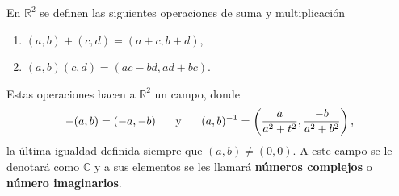 

\begin{definition}
En $\mathbb{R}^2$ se definen las siguientes operaciones de suma y multiplicación
\begin{enumerate}[label=\textnormal{(\roman*)}]
\item $(a,b) + (c,d) = (a+c, b+d)$,
\item $(a,b) (c,d) = (a c - b d, a d + b c)$.
\end{enumerate}
Estas operaciones hacen a $\mathbb{R}^2$ un campo, donde
\begin{equation*}
    -(a, b) = (-a, -b) \hspace{0.5cm} \text{ y } \hspace{0.5cm} (a,b)^{-1} = \left( \frac{a}{a^2 + t^2}, \frac{-b}{a^2 + b^2} \right),
\end{equation*}
la última igualdad definida siempre que $(a,b) \ne (0,0)$. A este campo se le denotará como $\mathbb{C}$ y a sus elementos se les llamará \textbf{números complejos} o \textbf{número imaginarios}.
\end{definition}
